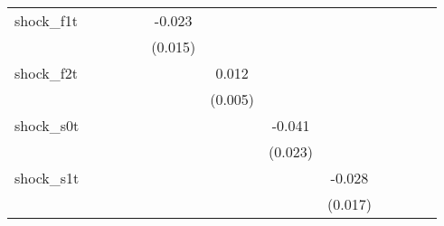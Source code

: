 {\begin{tabular}{l*{12}{c}}
\addlinespace
shock\_f1t   &                     &                     &                     &                     &      -0.023         &                     &                     &                     &                     &                     &                     &                     \\
            &                     &                     &                     &                     &     (0.015)         &                     &                     &                     &                     &                     &                     &                     \\
\addlinespace
shock\_f2t   &                     &                     &                     &                     &                     &       0.012\sym{**} &                     &                     &                     &                     &                     &                     \\
            &                     &                     &                     &                     &                     &     (0.005)         &                     &                     &                     &                     &                     &                     \\
\addlinespace
shock\_s0t   &                     &                     &                     &                     &                     &                     &      -0.041\sym{*}  &                     &                     &                     &                     &                     \\
            &                     &                     &                     &                     &                     &                     &     (0.023)         &                     &                     &                     &                     &                     \\
\addlinespace
shock\_s1t   &                     &                     &                     &                     &                     &                     &                     &      -0.028         &                     &                     &                     &                     \\
            &                     &                     &                     &                     &                     &                     &                     &     (0.017)         &                     &                     &                     &                     \\

\end{tabular}}
